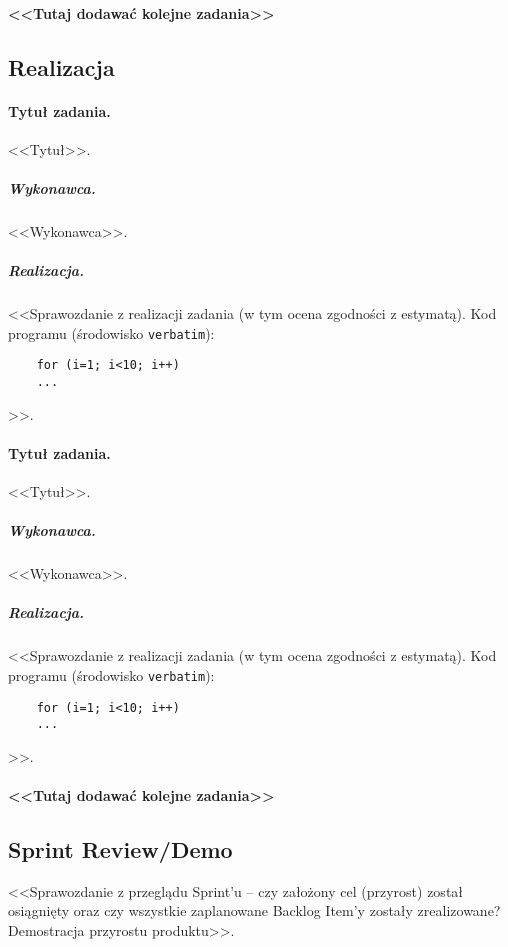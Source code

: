 	\paragraph{<<Tutaj dodawać kolejne zadania>>}
	
	\subsection{Realizacja}
	
	\paragraph{Tytuł zadania.} <<Tytuł>>.
	\subparagraph{Wykonawca.} <<Wykonawca>>.
	\subparagraph{Realizacja.} <<Sprawozdanie z realizacji zadania (w tym ocena zgodności z estymatą). Kod programu (środowisko \texttt{verbatim}): \begin{verbatim}
	for (i=1; i<10; i++)
	...
	\end{verbatim}>>.
	
	\paragraph{Tytuł zadania.} <<Tytuł>>.
	\subparagraph{Wykonawca.} <<Wykonawca>>.
	\subparagraph{Realizacja.} <<Sprawozdanie z realizacji zadania (w tym ocena zgodności z estymatą). Kod programu (środowisko \texttt{verbatim}): \begin{verbatim}
	for (i=1; i<10; i++)
	...
	\end{verbatim}>>.
	
	\paragraph{<<Tutaj dodawać kolejne zadania>>}
	
	
	\subsection{Sprint Review/Demo}
	<<Sprawozdanie z przeglądu Sprint'u -- czy założony cel (przyrost) został osiągnięty oraz czy wszystkie zaplanowane Backlog Item'y zostały zrealizowane? Demostracja przyrostu produktu>>.
	
